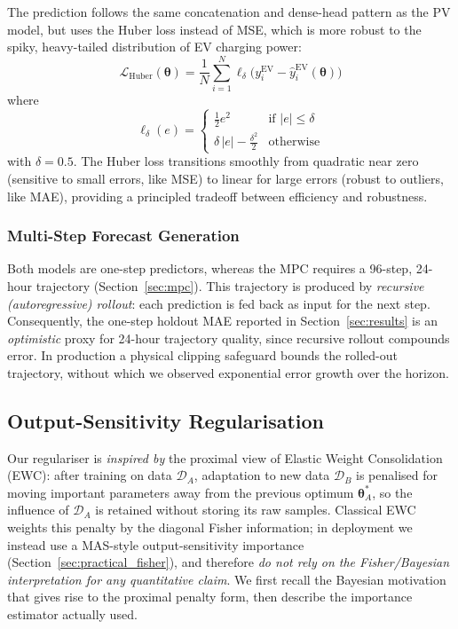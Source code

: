 \documentclass[journal]{IEEEtran}
\newcommand{\params}{\bm{\theta}}
\begin{document}
The prediction follows the same concatenation and dense-head pattern as
the PV model, but uses the Huber loss instead of
MSE, which is more robust to the spiky, heavy-tailed distribution of EV
charging power:
\begin{equation}
    \mathcal{L}_{\mathrm{Huber}}(\boldsymbol{\theta}) = \frac{1}{N}
    \sum_{i=1}^{N} \ell_\delta\bigl(y_i^{\mathrm{EV}} -
    \hat{y}_i^{\mathrm{EV}}(\boldsymbol{\theta})\bigr)
    \label{eq:huber_loss}
\end{equation}
where
\begin{equation}
    \ell_\delta(e) = \begin{cases}
        \frac{1}{2} e^2 & \text{if } |e| \leq \delta \\
        \delta\,|e| - \frac{\delta^2}{2} & \text{otherwise}
    \end{cases}
    \label{eq:huber_def}
\end{equation}
with $\delta = 0.5$. The Huber loss transitions smoothly from quadratic
near zero (sensitive to small errors, like MSE) to linear for large
errors (robust to outliers, like MAE), providing a principled tradeoff
between efficiency and robustness.

\subsubsection{Multi-Step Forecast Generation}
Both models are one-step predictors, whereas the MPC requires a 96-step,
24-hour trajectory (Section~\ref{sec:mpc}). This trajectory is produced
by \emph{recursive (autoregressive) rollout}: each prediction is fed back
as input for the next step. Consequently, the one-step holdout MAE
reported in Section~\ref{sec:results} is an \emph{optimistic} proxy for
24-hour trajectory quality, since recursive rollout compounds error. In
production a physical clipping safeguard bounds the rolled-out
trajectory, without which we observed exponential error growth over the
horizon.


\subsection{Output-Sensitivity Regularisation}
\label{sec:ewc}

Our regulariser is \emph{inspired by} the proximal view of Elastic
Weight Consolidation (EWC): after training on data $\mathcal{D}_A$, adaptation
to new data $\mathcal{D}_B$ is penalised for moving important parameters
away from the previous optimum $\params_A^*$, so the influence of
$\mathcal{D}_A$ is retained without storing its raw samples. Classical EWC
weights this penalty by the diagonal Fisher information; in deployment we
instead use a MAS-style output-sensitivity importance
(Section~\ref{sec:practical_fisher}), and therefore \emph{do not rely on
the Fisher/Bayesian interpretation for any quantitative claim}. We first
recall the Bayesian motivation that gives rise to the proximal penalty
form, then describe the importance estimator actually used.
\end{document}
